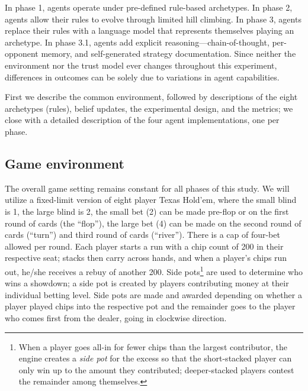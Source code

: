 \documentclass[10pt,twocolumn,letterpaper]{article}
\begin{document}
In phase 1, agents operate under pre-defined rule-based archetypes.
In phase 2, agents allow their rules to evolve through limited hill
climbing. In phase 3, agents replace their rules with a language
model that represents themselves playing an archetype. In phase 3.1,
agents add explicit reasoning---chain-of-thought, per-opponent
memory, and self-generated strategy documentation. Since neither the
environment nor the trust model ever changes throughout this
experiment, differences in outcomes can be solely due to variations
in agent capabilities.

First we describe the common environment, followed by descriptions
of the eight archetypes (rules), belief updates, the experimental
design, and the metrics; we close with a detailed description of the
four agent implementations, one per phase.

\subsection{Game environment}
The overall game setting remains constant for all phases of this
study. We will utilize a fixed-limit version of eight player Texas
Hold'em, where the small blind is 1, the large blind is 2, the small
bet (2) can be made pre-flop or on the first round of cards (the
``flop''), the large bet (4) can be made on the
second round of cards (``turn'') and third round of cards
(``river''). There is a cap of four-bet allowed per round. Each player starts a run with a chip count of 200 in their
respective seat; stacks then carry across hands, and when a player's
chips run out, he/she receives a rebuy of another 200. Side
pots\footnote{When a player goes all-in for fewer chips than the
largest contributor, the engine creates a \textit{side pot} for the
excess so that the short-stacked player can only win up to the
amount they contributed; deeper-stacked players contest the
remainder among themselves.} are used to determine who wins a
showdown; a side pot is created by
players contributing money at their individual betting level. Side
pots are made and awarded depending on whether a player played chips
into the respective pot and the remainder goes to the player who
comes first from the dealer, going in clockwise direction.
\end{document}
